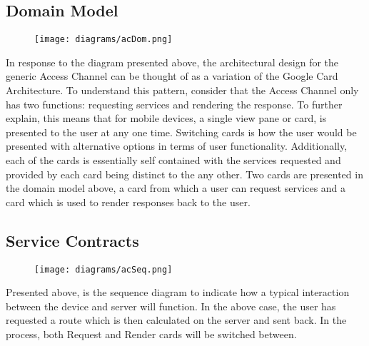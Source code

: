 \documentclass[12pt]{article}
\begin{document}
\subsection{Domain Model}
\begin{figure}[h]
\centering
\texttt{[image: diagrams/acDom.png]}

\end{figure}
In response to the diagram presented above, the architectural design for the generic Access Channel can be thought of as a variation of the Google Card Architecture. To understand this pattern, consider that the Access Channel only has two functions: requesting services and rendering the response. To further explain, this means that for mobile devices, a single view pane or card, is presented to the user at any one time. Switching cards is how the user would be presented with alternative options in terms of user functionality. Additionally, each of the cards is essentially self contained with the services requested and provided by each card being distinct to the any other. Two cards are presented in the domain model above, a card from which a user can request services and a card which is used to render responses back to the user.
\subsection{Service Contracts}
\begin{figure}[h]
\centering
\texttt{[image: diagrams/acSeq.png]}

\end{figure}
Presented above, is the sequence diagram to indicate how a typical interaction between the device and server will function. In the above case, the user has requested a route which is then calculated on the server and sent back. In the process, both Request and Render cards 
will be switched between.
\end{document}
